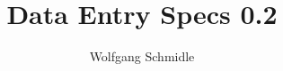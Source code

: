 \documentclass[11pt, a4paper, 
headinclude, 
normalheadings,
halfparskip-, 
pointlessnumbers]{scrartcl}
\begin{document}
\title{Data Entry Specs 0.2}
\author{Wolfgang Schmidle}
\maketitle

\tableofcontents


\end{document}
